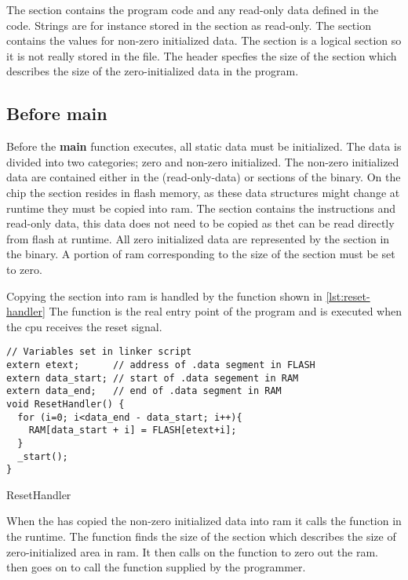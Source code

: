 The  section contains the program code and any read-only data defined in the code.
Strings are for instance stored in the  section as read-only.
The  section contains the values for non-zero initialized data.
The  section is a logical section so it is not really stored in the file.
The header specfies the size of the  section which describes the size of the zero-initialized data in the program.

\subsection{Before main}
\label{sec:before-main}
Before the \textbf{main} function executes, all static data must be initialized.
The data is divided into two categories; zero and non-zero initialized.
The non-zero initialized data are contained either in the  (read-only-data) or  sections of the {\elf} binary.
On the chip the  section resides in flash memory, as these data structures might change at runtime they must be copied into \gls{ram}.
The  section contains the instructions and read-only data, this data does not need to be copied as thet can be read directly from flash at runtime.
All zero initialized data are represented by the  section in the {\elf} binary.
A portion of \gls{ram} corresponding to the size of the  section must be set to zero.

Copying the  section into \gls{ram} is handled by the  function shown in \autoref{lst:reset-handler}
The function is the real entry point of the program and is executed when the \gls{cpu} receives the reset signal.

\begin{listing}[H]
\begin{verbatim}
// Variables set in linker script
extern etext;      // address of .data segment in FLASH
extern data_start; // start of .data segement in RAM
extern data_end;   // end of .data segment in RAM
void ResetHandler() {
  for (i=0; i<data_end - data_start; i++){
    RAM[data_start + i] = FLASH[etext+i];
  }
  _start();
}
\end{verbatim}
\caption{ResetHandler}
\label{lst:reset-handler}
\end{listing}

When the  has copied the non-zero initialized data into \gls{ram} it calls the  function in the {\C} runtime.
The  function finds the size of the  section which describes the size of zero-initialized area in \gls{ram}.
It then calls on the  function to zero out the \gls{ram}.
 then goes on to call the {\main} function supplied by the programmer.

